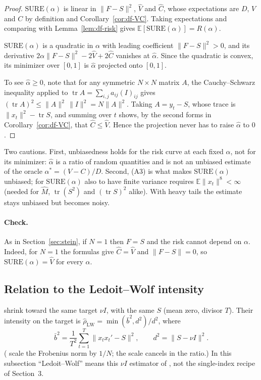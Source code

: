\begin{proof}
$\mathrm{SURE}(\alpha)$ is linear in $\|F - S\|^2$, $\hat V$ and $\hat C$, whose expectations are $D$, $V$ and $C$ by definition and Corollary~\ref{cor:df-VC}. Taking expectations and comparing with Lemma~\ref{lem:df-risk} gives $\mathbb{E}[\mathrm{SURE}(\alpha)] = R(\alpha)$.

$\mathrm{SURE}(\alpha)$ is a quadratic in $\alpha$ with leading coefficient $\|F - S\|^2 > 0$, and its derivative $2\alpha\|F - S\|^2 - 2\hat V + 2\hat C$ vanishes at $\hat\alpha$. Since the quadratic is convex, its minimizer over $[0,1]$ is $\hat\alpha$ projected onto $[0,1]$.

To see $\hat\alpha \ge 0$, note that for any symmetric $N \times N$ matrix $A$, the Cauchy--Schwarz inequality applied to $\operatorname{tr}A = \sum_{i,j}a_{ij}(I)_{ij}$ gives $(\operatorname{tr}A)^2 \le \|A\|^2\,\|I\|^2 = N\|A\|^2$. Taking $A = y_t - S$, whose trace is $\|x_t\|^2 - \operatorname{tr}S$, and summing over $t$ shows, by the second forms in Corollary~\ref{cor:df-VC}, that $\hat C \le \hat V$. Hence the projection never has to raise $\hat\alpha$ to $0$.
\end{proof}

Two cautions. First, unbiasedness holds for the risk curve at each fixed $\alpha$, not for its minimizer: $\hat\alpha$ is a ratio of random quantities and is not an unbiased estimate of the oracle $\alpha^* = (V - C)/D$. Second, (A3) is what makes $\mathrm{SURE}(\alpha)$ unbiased; for $\mathrm{SURE}(\alpha)$ also to have finite variance requires $\mathbb{E}\|x_t\|^8 < \infty$ (needed for $\hat M$, $\operatorname{tr}(S^2)$ and $(\operatorname{tr}S)^2$ alike). With heavy tails the estimate stays unbiased but becomes noisy.

\paragraph{Check.}
As in Section~\ref{sec:stein}, if $N = 1$ then $F = S$ and the risk cannot depend on $\alpha$. Indeed, for $N = 1$ the formulas give $\hat C = \hat V$ and $\|F - S\| = 0$, so $\mathrm{SURE}(\alpha) = \hat V$ for every $\alpha$.

\subsection{Relation to the Ledoit--Wolf intensity}

\citet{ledoit2004} shrink toward the same target $\nu I$, with the same $S$ (mean zero, divisor $T$). Their intensity on the target is $\hat\rho_{\mathrm{LW}} = \min(\bar b^2, d^2)/d^2$, where
\[
  \bar b^2 = \frac{1}{T^2}\sum_{t=1}^T \|x_t x_t' - S\|^2, \qquad d^2 = \|S - \nu I\|^2 .
\]
(\citeauthor{ledoit2004} scale the Frobenius norm by $1/N$; the scale cancels in the ratio.) In this subsection ``Ledoit--Wolf'' means this $\nu I$ estimator of \citet{ledoit2004}, not the single-index recipe of Section~3.

